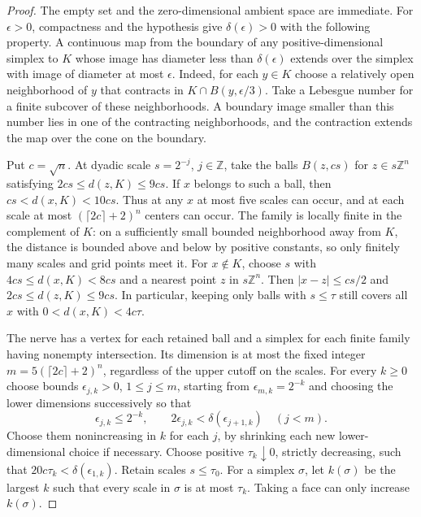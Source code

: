 \documentclass[11pt,oneside,openany]{book}
\theoremstyle{plain}
\theoremstyle{definition}
\theoremstyle{remark}
\newcommand{\Z}{\mathbb Z}
\begin{document}
\begin{proof}
The empty set and the zero-dimensional ambient space are immediate.
For \(\epsilon>0\), compactness and the hypothesis give
\(\delta(\epsilon)>0\) with the following property. A continuous
map from the boundary of any positive-dimensional simplex to \(K\)
whose image has diameter less than \(\delta(\epsilon)\) extends
over the simplex with image of diameter at most \(\epsilon\).
Indeed, for each \(y\in K\) choose a relatively open neighborhood
of \(y\) that contracts in \(K\cap B(y,\epsilon/3)\).
Take a Lebesgue number for a finite subcover of these neighborhoods.
A boundary image smaller than this number lies in one of the
contracting neighborhoods, and the contraction extends the map
over the cone on the boundary.

Put \(c=\sqrt n\). At dyadic scale \(s=2^{-j}\), \(j\in\Z\), take
the balls \(B(z,cs)\) for \(z\in s\Z^n\) satisfying
\(2cs\le d(z,K)\le9cs\). If \(x\) belongs to such a ball, then
\(cs<d(x,K)<10cs\). Thus at any \(x\) at most five scales can
occur, and at each scale at most \((\lceil 2c\rceil+2)^n\) centers
can occur. The family is locally finite in the complement of \(K\):
on a sufficiently small bounded neighborhood away from \(K\), the
distance is bounded above and below by positive constants, so
only finitely many scales and grid points meet it.
For \(x\notin K\), choose \(s\) with
\(4cs\le d(x,K)<8cs\) and a nearest point \(z\) in \(s\Z^n\).
Then \(|x-z|\le cs/2\) and \(2cs\le d(z,K)\le9cs\).
In particular, keeping only balls with \(s\le\tau\) still covers
all \(x\) with \(0<d(x,K)<4c\tau\).

The nerve has a vertex for each retained ball and a simplex for
each finite family having nonempty intersection. Its dimension is
at most the fixed integer \(m=5(\lceil 2c\rceil+2)^n\), regardless
of the upper cutoff on the scales. For every \(k\ge0\) choose bounds
\(\epsilon_{j,k}>0\), \(1\le j\le m\), starting from
\(\epsilon_{m,k}=2^{-k}\) and choosing the lower dimensions
successively so that
\[
 \epsilon_{j,k}\le 2^{-k},\qquad
 2\epsilon_{j,k}<\delta(\epsilon_{j+1,k})\quad(j<m).
\]
Choose them nonincreasing in \(k\) for each \(j\), by shrinking
each new lower-dimensional choice if necessary. Choose positive
\(\tau_k\downarrow0\), strictly decreasing, such that
\(20c\tau_k<\delta(\epsilon_{1,k})\). Retain scales \(s\le\tau_0\).
For a simplex \(\sigma\), let \(k(\sigma)\) be the largest \(k\)
such that every scale in \(\sigma\) is at most \(\tau_k\).
Taking a face can only increase \(k(\sigma)\).


\end{proof}
\end{document}
